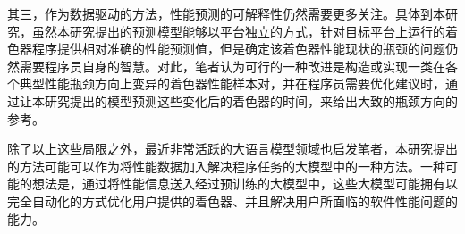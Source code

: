 其三，作为数据驱动的方法，性能预测的可解释性仍然需要更多关注。具体到本研究，虽然本研究提出的预测模型能够以平台独立的方式，针对目标平台上运行的着色器程序提供相对准确的性能预测值，但是确定该着色器性能现状的瓶颈的问题仍然需要程序员自身的智慧。对此，笔者认为可行的一种改进是构造或实现一类在各个典型性能瓶颈方向上变异的着色器性能样本对，并在程序员需要优化建议时，通过让本研究提出的模型预测这些变化后的着色器的时间，来给出大致的瓶颈方向的参考。

除了以上这些局限之外，最近非常活跃的大语言模型领域也启发笔者，本研究提出的方法可能可以作为将性能数据加入解决程序任务的大模型中的一种方法。一种可能的想法是，通过将性能信息送入经过预训练的大模型中，这些大模型可能拥有以完全自动化的方式优化用户提供的着色器、并且解决用户所面临的软件性能问题的能力。
